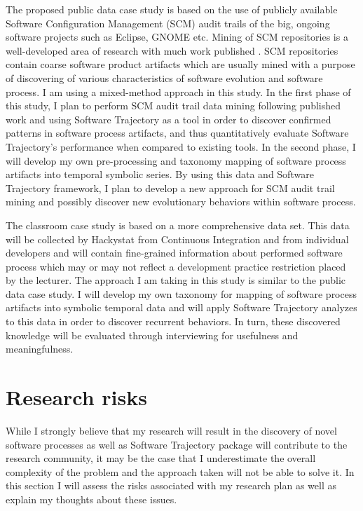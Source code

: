 \documentclass{sig-alternate}
\begin{document}
The proposed public data case study is based on the use of publicly available Software Configuration Management (SCM) audit trails of the big, ongoing software projects such as Eclipse, GNOME etc. Mining of SCM repositories is a well-developed area of research with much work published \cite{citeulike:5043676}. SCM repositories contain coarse software product artifacts which are usually mined with a purpose of discovering of various characteristics of software evolution and software process. I am using a mixed-method approach in this study. In the first phase of this study, I plan to perform SCM audit trail data mining following published work and using Software Trajectory as a tool in order to discover confirmed patterns in software process artifacts, and thus quantitatively evaluate Software Trajectory's performance when compared to existing tools. In the second phase, I will develop my own pre-processing and taxonomy mapping of software process artifacts into temporal symbolic series. By using this data and Software Trajectory framework, I plan to develop a new approach for SCM audit trail mining and possibly discover new evolutionary behaviors within software process. 

The classroom case study is based on a more comprehensive data set. This data will be collected by Hackystat from Continuous Integration and from individual developers and will contain fine-grained information about performed software process which may or may not reflect a development practice restriction placed by the lecturer. The approach I am taking in this study is similar to the public data case study. I will develop my own taxonomy for mapping of software process artifacts into symbolic temporal data and will apply Software Trajectory analyzes to this data in order to discover recurrent behaviors. In turn, these discovered knowledge will be evaluated through interviewing for usefulness and meaningfulness. 

\section{Research risks}
While I strongly believe that my research will result in the discovery of novel software processes as well as Software Trajectory package will contribute to the research community, it may be the case that I underestimate the overall complexity of the problem and the approach taken will not be able to solve it. In this section I will assess the risks associated with my research plan as well as explain my thoughts about these issues.
\end{document}
